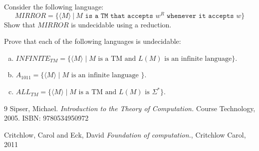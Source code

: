 \documentclass[12pt]{article}
\newenvironment{exercise}[2][Exercise]{\begin{trivlist}
\item[\hskip \labelsep {\bfseries #1}\hskip \labelsep {\bfseries #2.}]}{\end{trivlist}}
\begin{document}
\newpage


\begin{exercise}{3}
Consider the following language: \[MIRROR=\{\langle M\rangle \ | \ M \texttt{ is a TM that accepts } w^R \texttt{ whenever it accepts } w\}\] 
Show that $MIRROR$ is undecidable using a reduction.
\end{exercise}

\newpage

\begin{exercise}{4}
Prove that each of the following languages is undecidable:
\begin{enumerate}[(a)]
\setlength{\itemsep}{10em}
\item $INFINITE_{TM} = \{ \langle M \rangle \; \vert \; M \text{ is a TM and } L(M) \text{ is an infinite language} \} $.


\item $A_{1011} = \{ \langle M \rangle \; \vert \; M \text{ is an infinite language }\} $.


\item $ALL_{TM} = \{ \langle M \rangle \; \vert \; M \text{ is a TM and } L(M) \text{ is }\Sigma^* \} $.


\end{enumerate}
\end{exercise}



\vfill
\begin{thebibliography}{9}
Sipser, Michael. 
\textit{Introduction to the Theory of Computation.}
Course Technology, 2005. ISBN: 9780534950972

Critchlow, Carol and Eck, David
\textit{Foundation of computation.},
Critchlow Carol, 2011
\end{thebibliography}


 
\end{document}
